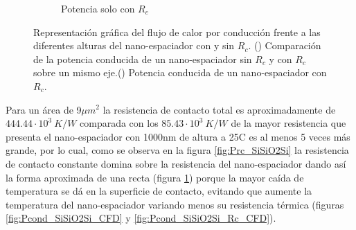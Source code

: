 \begin{figure}[H]
\begin{subfigure}[b]{0.49\textwidth}
		\caption{Potencia solo con $R_c$}
		\label{fig:Prc2_SiSiO2Si}
	\end{subfigure}
	\caption[Efectos de la resistencia de contacto sobre el flujo de calor por conducción]{Representación gráfica del flujo de calor por conducción frente a las diferentes alturas del nano-espaciador con y sin $R_c$. () Comparación de la potencia conducida de un nano-espaciador sin $R_c$ y con $R_c$ sobre un mismo eje.()  Potencia conducida de un nano-espaciador con $R_c$.}
	\label{fig:PcondRc_SiSiO2Si}
\end{figure}
Para un área de 9$\mu m^2$ la resistencia de contacto total es aproximadamente de $444.44\cdot 10^3 \ K/W$ comparada con los $85.43\cdot 10^3 \ K/W$ de la mayor resistencia que presenta el nano-espaciador con 1000nm de altura a 25\textdegree C es al menos 5 veces más grande, por lo cual, como se observa en la figura \ref{fig:Prc_SiSiO2Si} la resistencia de contacto constante domina sobre la resistencia del nano-espaciador dando así la forma aproximada de una recta (figura \ref{fig:Prc2_SiSiO2Si}) porque la mayor caída de temperatura se dá en la superficie de contacto, evitando que aumente la temperatura del nano-espaciador variando menos su resistencia térmica (figuras \ref{fig:Pcond_SiSiO2Si_CFD} y \ref{fig:Pcond_SiSiO2Si_Rc_CFD}).
\graphicspath{ {./figuras/Resultados/conduccion/} }
